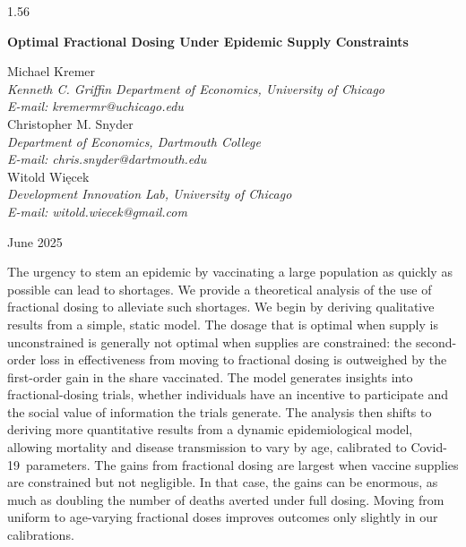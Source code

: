 \documentclass[12pt]{article}
\newcommand{\covid}{Covid-19}
\begin{document}
\begin{spacing}{1.56}

\begin{titlepage}
\singlespace

\begin{center}
{\large \bf Optimal Fractional Dosing Under Epidemic Supply Constraints}
\end{center}

\vspace{2ex}

{\flushleft
Michael Kremer\\
{\em Kenneth C. Griffin Department of Economics, University of Chicago\\ 
E-mail: kremermr@uchicago.edu}\\[2ex]
Christopher M. Snyder\\
{\em Department of Economics, Dartmouth College\\
E-mail: chris.snyder@dartmouth.edu}\\[2ex]
Witold Więcek\\
{\em Development Innovation Lab, University of Chicago\\
E-mail: witold.wiecek@gmail.com}}

\vspace{2ex}

\begin{center}
June 2025
\end{center}

\vspace{2ex}

 The urgency to stem an epidemic by
vaccinating a large population as quickly as possible can lead to
shortages. We provide a theoretical analysis of the use of fractional
dosing to alleviate such shortages. We begin by deriving qualitative
results from a simple, static model. The dosage that is optimal when
supply is unconstrained is generally not optimal when supplies are
constrained: the second-order loss in effectiveness from moving to
fractional dosing is outweighed by the first-order gain in the share
vaccinated. The model generates insights into fractional-dosing
trials, whether individuals have an incentive to participate and the
social value of information the trials generate. The analysis then
shifts to deriving more quantitative results from a dynamic
epidemiological model, allowing mortality and disease transmission to
vary by age, calibrated to \covid\ parameters. The gains from
fractional dosing are largest when vaccine supplies are constrained
but not negligible. In that case, the gains can be enormous, as much
as doubling the number of deaths averted under full dosing. Moving
from uniform to age-varying fractional doses improves outcomes only
slightly in our calibrations.


\end{titlepage}
\end{spacing}
\end{document}
